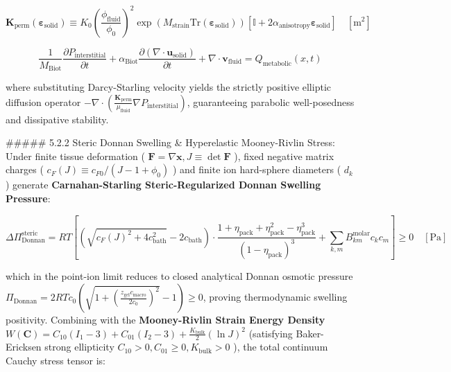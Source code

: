 \documentclass[11pt,a4paper]{article}
\theoremstyle{definition}
\theoremstyle{remark}
\begin{document}
\begin{equation}
\mathbf{K}_{\text{perm}}(\boldsymbol{\varepsilon}_{\text{solid}}) \equiv K_0 \left( \frac{\phi_{\text{fluid}}}{\phi_0} \right)^2 \exp\left( M_{\text{strain}} \mathrm{Tr}(\boldsymbol{\varepsilon}_{\text{solid}}) \right) [ \mathbb{I} + 2 \alpha_{\text{anisotropy}} \boldsymbol{\varepsilon}_{\text{solid}} ] \quad [\mathrm{m^2}]
\end{equation}



\begin{equation}
\boxed{\frac{1}{M_{\text{Biot}}} \frac{\partial P_{\text{interstitial}}}{\partial t} + \alpha_{\text{Biot}} \frac{\partial (\nabla \cdot \mathbf{u}_{\text{solid}})}{\partial t} + \nabla \cdot \mathbf{v}_{\text{fluid}} = Q_{\text{metabolic}}(x, t)}
\end{equation}


where substituting Darcy-Starling velocity yields the strictly positive elliptic diffusion operator $-\nabla \cdot \left(\frac{\mathbf{K}_{\text{perm}}}{\mu_{\text{fluid}}}\nabla P_{\text{interstitial}}\right)$, guaranteeing parabolic well-posedness and dissipative stability.

\#\#\#\#\# 5.2.2 Steric Donnan Swelling \& Hyperelastic Mooney-Rivlin Stress:
Under finite tissue deformation ( $\mathbf{F} = \nabla \mathbf{x}, J \equiv \det \mathbf{F}$ ), fixed negative matrix charges ( $c_F(J) \equiv c_{F0}/(J - 1 + \phi_0)$ ) and finite ion hard-sphere diameters ( $d_k$ ) generate \textbf{Carnahan-Starling Steric-Regularized Donnan Swelling Pressure}:


\begin{equation}
\boxed{\Delta \Pi_{\text{Donnan}}^{\text{steric}} = R T [ \left( \sqrt{c_F(J)^2 + 4 c_{\text{bath}}^2} - 2 c_{\text{bath}} \right) \cdot \frac{1 + \eta_{\text{pack}} + \eta_{\text{pack}}^2 - \eta_{\text{pack}}^3}{(1 - \eta_{\text{pack}})^3} + \sum_{k, m} B_{km}^{\text{molar}} c_k c_m ] \ge 0 \quad [\mathrm{Pa}]}
\end{equation}


which in the point-ion limit reduces to closed analytical Donnan osmotic pressure $\Pi_{\text{Donnan}} = 2 R T c_0 \left( \sqrt{1 + \left(\frac{z_{\text{gel}}c_{\text{macro}}}{2 c_0}\right)^2} - 1 \right) \ge 0$, proving thermodynamic swelling positivity. Combining with the \textbf{Mooney-Rivlin Strain Energy Density} $W(\mathbf{C}) = C_{10}(I_1 - 3) + C_{01}(I_2 - 3) + \frac{K_{\text{bulk}}}{2}(\ln J)^2$ (satisfying Baker-Ericksen strong ellipticity $C_{10} > 0, C_{01} \ge 0, K_{\text{bulk}} > 0$ ), the total continuum Cauchy stress tensor is:
\end{document}
